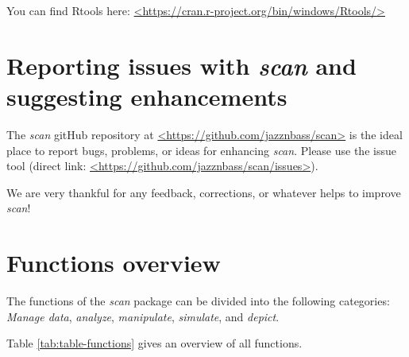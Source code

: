 \documentclass[
]{book}
\begin{document}
You can find Rtools here: \href{https://cran.r-project.org/bin/windows/Rtools/}{\textless https://cran.r-project.org/bin/windows/Rtools/\textgreater{}}

\hypertarget{reporting-issues-with-scan-and-suggesting-enhancements}{%
\section{\texorpdfstring{Reporting issues with \emph{scan} and suggesting enhancements}{Reporting issues with scan and suggesting enhancements}}\label{reporting-issues-with-scan-and-suggesting-enhancements}}

The \emph{scan} gitHub repository at \href{https://github.com/jazznbass/scan}{\textless https://github.com/jazznbass/scan\textgreater{}} is the ideal place to report bugs, problems, or ideas for enhancing \emph{scan}. Please use the issue tool (direct link: \href{https://github.com/jazznbass/scan/issues}{\textless https://github.com/jazznbass/scan/issues\textgreater{}}).

We are very thankful for any feedback, corrections, or whatever helps to improve \emph{scan}!

\hypertarget{functions-overview}{%
\section{Functions overview}\label{functions-overview}}

The functions of the \emph{scan} package can be divided into the following categories:\\
\emph{Manage data}, \emph{analyze}, \emph{manipulate}, \emph{simulate}, and \emph{depict}.

Table \ref{tab:table-functions} gives an overview of all functions.
\end{document}
